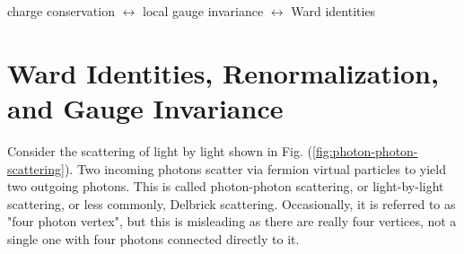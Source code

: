 \begin{qt}
    charge conservation $\leftrightarrow$ local gauge invariance $\leftrightarrow$ Ward identities
\end{qt}
\section{Ward Identities, Renormalization, and Gauge Invariance}
Consider the scattering of light by light shown in Fig. (\ref{fig:photon-photon-scattering}). Two incoming photons scatter via fermion virtual particles to yield two outgoing photons. This is called photon-photon scattering, or light-by-light scattering, or less commonly, Delbrick scattering. Occasionally, it is referred to as "four photon vertex", but this is misleading as there are really four vertices, not a single one with four photons connected directly to it.
